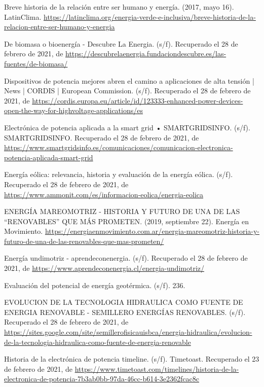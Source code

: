 \documentclass[12pt,letterpaper,superscriptaddress]{article}
\begin{document}
\begin{thebibliography}{99}

	\bibitem{} Breve historia de la relación entre ser humano y energía. (2017, mayo 16). LatinClima. \url{https://latinclima.org/energia-verde-e-inclusiva/breve-historia-de-la-relacion-entre-ser-humano-y-energia}

	\bibitem{} De biomasa o bioenergía - Descubre La Energia. (s/f). Recuperado el 28 de febrero de 2021, de \url{https://descubrelaenergia.fundaciondescubre.es/las-fuentes/de-biomasa/}
	
	\bibitem{} Dispositivos de potencia mejores abren el camino a aplicaciones de alta tensión | News | CORDIS | European Commission. (s/f). Recuperado el 28 de febrero de 2021, de \url{https://cordis.europa.eu/article/id/123333-enhanced-power-devices-open-the-way-for-highvoltage-applications/es}
	
	\bibitem{} Electrónica de potencia aplicada a la smart grid • SMARTGRIDSINFO. (s/f). SMARTGRIDSINFO. Recuperado el 28 de febrero de 2021, de \url{https://www.smartgridsinfo.es/comunicaciones/comunicacion-electronica-potencia-aplicada-smart-grid}
	
	\bibitem{} Energía eólica: relevancia, historia y evaluación de la energía eólica. (s/f). Recuperado el 28 de febrero de 2021, de \url{https://www.ammonit.com/es/informacion-eolica/energia-eolica}
	
	\bibitem{} ENERGÍA MAREOMOTRIZ - HISTORIA Y FUTURO DE UNA DE LAS “RENOVABLES” QUE MÁS PROMETEN. (2019, septiembre 22). Energía en Movimiento. \url{https://energiaenmovimiento.com.ar/energia-mareomotriz-historia-y-futuro-de-una-de-las-renovables-que-mas-prometen/}
	
	\bibitem{} Energía undimotriz - aprendeconenergia. (s/f). Recuperado el 28 de febrero de 2021, de \url{https://www.aprendeconenergia.cl/energia-undimotriz/}
	
	\bibitem{} Evaluación del potencial de energía geotérmica. (s/f). 236.
	
	\bibitem{} EVOLUCION DE LA TECNOLOGIA HIDRAULICA COMO FUENTE DE ENERGIA RENOVABLE - SEMILLERO ENERGÍAS RENOVABLES. (s/f). Recuperado el 28 de febrero de 2021, de \url{https://sites.google.com/site/semillerofisicauisbca/energia-hidraulica/evolucion-de-la-tecnologia-hidraulica-como-fuente-de-energia-renovable}
	
	\bibitem{} Historia de la electrónica de potencia timeline. (s/f). Timetoast. Recuperado el 23 de febrero de 2021, de \url{https://www.timetoast.com/timelines/historia-de-la-electronica-de-potencia-7b3ab0bb-97da-46cc-b614-3e2362fcac8c}
	

\end{thebibliography}
\end{document}
